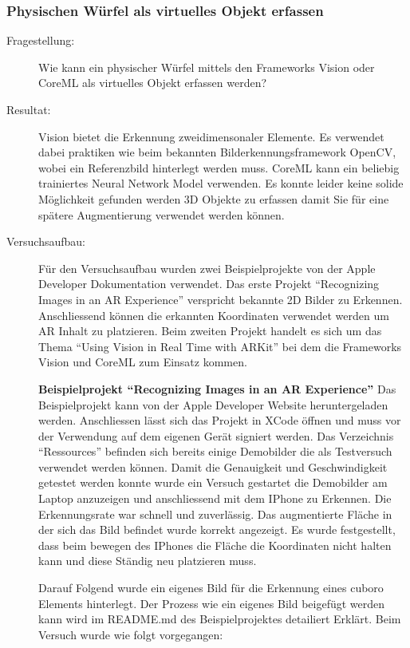 \subsubsection{Physischen Würfel als virtuelles Objekt erfassen}
\begin{description}
	\item[Fragestellung:] Wie kann ein physischer Würfel mittels den Frameworks Vision oder CoreML als virtuelles Objekt erfassen werden?
	\item[Resultat:] Vision bietet die Erkennung zweidimensonaler Elemente. Es verwendet dabei praktiken wie beim bekannten Bilderkennungsframework OpenCV, wobei ein Referenzbild hinterlegt werden muss. CoreML kann ein beliebig trainiertes Neural Network Model verwenden. Es konnte leider keine solide Möglichkeit gefunden werden 3D Objekte zu erfassen damit Sie für eine spätere Augmentierung verwendet werden können. 
	\item[Versuchsaufbau:] Für den Versuchsaufbau wurden zwei Beispielprojekte von der Apple Developer Dokumentation verwendet. Das erste Projekt "`Recognizing Images in an AR Experience"' \cite{arkit-recognize-images} verspricht bekannte 2D Bilder zu Erkennen. Anschliessend können die erkannten Koordinaten verwendet werden um AR Inhalt zu platzieren.
	Beim zweiten Projekt handelt es sich um das Thema "`Using Vision in Real Time with ARKit"' \cite{vision-real-time-with-arkit} bei dem die Frameworks Vision und CoreML zum Einsatz kommen.

	\textbf{Beispielprojekt "`Recognizing Images in an AR Experience"'}
	Das Beispielprojekt kann von der Apple Developer Website heruntergeladen werden. Anschliessen lässt sich das Projekt in XCode öffnen und muss vor der Verwendung auf dem eigenen Gerät signiert werden. Das Verzeichnis "`Ressources"' befinden sich bereits einige Demobilder die als Testversuch verwendet werden können. Damit die Genauigkeit und Geschwindigkeit getestet werden konnte wurde ein Versuch gestartet die Demobilder am Laptop anzuzeigen und anschliessend mit dem IPhone zu Erkennen. Die Erkennungsrate war schnell und zuverlässig. Das augmentierte Fläche in der sich das Bild befindet wurde korrekt angezeigt. Es wurde festgestellt, dass beim bewegen des IPhones die Fläche die Koordinaten nicht halten kann und diese Ständig neu platzieren muss.

	Darauf Folgend wurde ein eigenes Bild für die Erkennung eines cuboro Elements hinterlegt. Der Prozess wie ein eigenes Bild beigefügt werden kann wird im README.md des Beispielprojektes detailiert Erklärt. Beim Versuch wurde wie folgt vorgegangen: 


\end{description}
